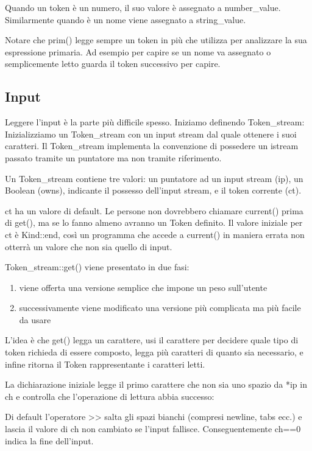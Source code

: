 \documentclass[11pt,a4paper]{book}
\begin{document}
Quando un token è un numero, il suo valore è assegnato a number\_value. Similarmente quando è un nome viene assegnato a string\_value.

Notare che prim() legge sempre un token in più che utilizza per analizzare la sua espressione primaria. Ad esempio per capire se un nome va assegnato o semplicemente letto guarda il token successivo per capire.

\subsection{Input}
Leggere l'input è la parte più difficile spesso. 
Iniziamo definendo Token\_stream:
\label{code: 133}
Inizializziamo un Token\_stream con un input stream dal quale ottenere i suoi caratteri. Il Token\_stream implementa la convenzione di possedere un istream passato tramite un puntatore ma non tramite riferimento. 

Un Token\_stream contiene tre valori: un puntatore ad un input stream (ip), un Boolean (owns), indicante il possesso dell'input stream, e il token corrente (ct).

ct ha un valore di default. Le persone non dovrebbero chiamare current() prima di get(), ma se lo fanno almeno avranno un Token definito. Il valore iniziale per ct è Kind::end, così un programma che accede a current() in maniera errata non otterrà un valore che non sia quello di input.

Token\_stream::get() viene presentato in due fasi:
\begin{enumerate}
	\item viene offerta una versione semplice che impone un peso sull'utente
	\item successivamente viene modificato una versione più complicata ma più facile da usare
\end{enumerate}

L'idea è che get() legga un carattere, usi il carattere per decidere quale tipo di token richieda di essere composto, legga più caratteri di quanto sia necessario, e infine ritorna il Token rappresentante i caratteri letti.

La dichiarazione iniziale legge il primo carattere che non sia uno spazio da *ip in ch e controlla che l'operazione di lettura abbia successo:
\label{code: 134}

Di default l'operatore >> salta gli spazi bianchi (compresi newline, tabs ecc.) e lascia il valore di ch non cambiato se l'input fallisce. Conseguentemente ch==0 indica la fine dell'input.
\end{document}

